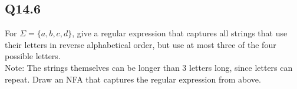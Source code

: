 \documentclass{article}
\begin{document}
\subsection*{Q14.6}
For $\Sigma=\{a,b,c,d\}$, give a regular expression that captures all strings that use their letters in reverse alphabetical order, but use at most three of the four possible letters.
\\ Note: The strings themselves can be longer than 3 letters long, since letters can repeat.
 Draw an NFA that captures the regular expression from above.
\newpage

\end{document}

